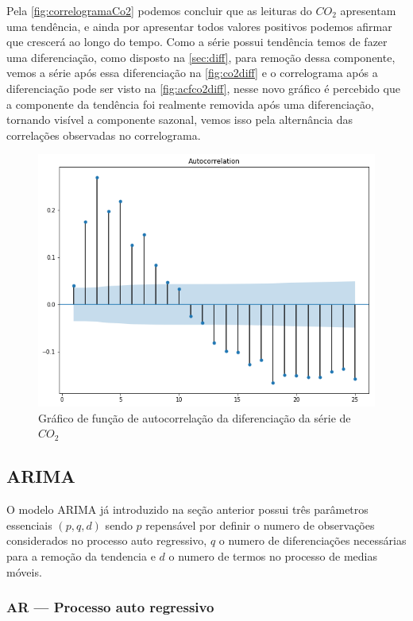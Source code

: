 \documentclass[
    12pt,
    oneside,
    a4paper,
    english,
    brazil
]{abntex2}
\begin{document}
Pela \autoref{fig:correlogramaCo2}  podemos concluir que as  leituras do $CO_2$
apresentam  uma  tendência, e  ainda  por  apresentar todos  valores  positivos
podemos afirmar que  crescerá ao longo do tempo. Como  a série possui tendência
temos  de  fazer  uma   diferenciação,  como  disposto  na  \autoref{sec:diff},
para  remoção  dessa componente,  vemos  a  série  após essa  diferenciação  na
\autoref{fig:co2diff} e o  correlograma após a diferenciação pode  ser visto na
\autoref{fig:acfco2diff}, nesse  novo gráfico é  percebido que a  componente da
tendência foi  realmente removida  após uma  diferenciação, tornando  visível a
componente sazonal, vemos  isso pela alternância das  correlações observadas no
correlograma.

\begin{figure}
    \centering
    \caption{Gráfico de função de autocorrelação da diferenciação da série de
        $CO_2$}\label{fig:acfco2diff}
    \includegraphics[width=.6\linewidth]{images/acf_co2_diff.png}
\end{figure}


\subsection{ARIMA}

O modelo ARIMA já introduzido na seção anterior possui três parâmetros
essenciais $(p,q,d)$ sendo $p$ repensável por definir o numero de observações
considerados no processo auto regressivo, $q$ o numero de diferenciações
necessárias para a remoção da tendencia e $d$ o numero de termos no processo de
medias móveis.

\subsubsection{AR --- Processo auto regressivo}
\end{document}
